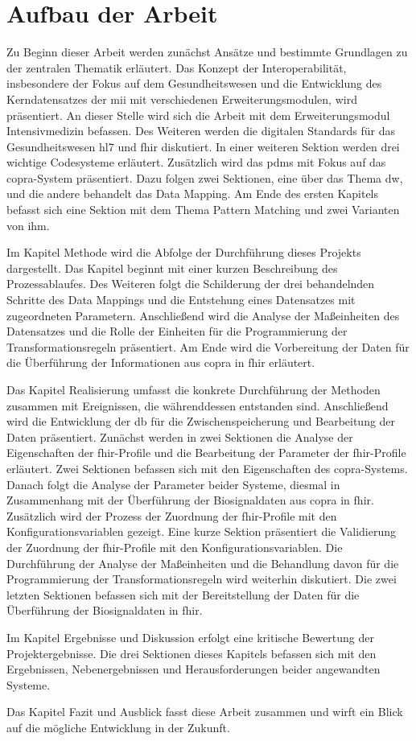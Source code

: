 \section{Aufbau der Arbeit} \label{sec:structure}

Zu Beginn dieser Arbeit werden zunächst Ansätze und bestimmte Grundlagen zu der zentralen Thematik erläutert. Das Konzept der Interoperabilität, insbesondere der Fokus auf dem Gesundheitswesen und die Entwicklung des Kerndatensatzes der \ac{mii} mit verschiedenen Erweiterungsmodulen, wird präsentiert. An dieser Stelle wird sich die Arbeit mit dem Erweiterungsmodul Intensivmedizin befassen. Des Weiteren werden die digitalen Standards für das Gesundheitswesen \ac{hl7} und \ac{fhir} diskutiert. In einer weiteren Sektion werden drei wichtige Codesysteme erläutert. Zusätzlich wird das \ac{pdms} mit Fokus auf das \ac{copra}-System präsentiert. Dazu folgen zwei Sektionen, eine über das Thema \ac{dw}, und die andere behandelt das Data Mapping. Am Ende des ersten Kapitels befasst sich eine Sektion mit dem Thema Pattern Matching und zwei Varianten von ihm.

Im Kapitel \glqq Methode\grqq{} wird die Abfolge der Durchführung dieses Projekts dargestellt. Das Kapitel beginnt mit einer kurzen Beschreibung des Prozessablaufes. Des Weiteren folgt die Schilderung der drei behandelnden Schritte des Data Mappings und die Entstehung eines Datensatzes mit zugeordneten Parametern. Anschließend wird die Analyse der Maßeinheiten des Datensatzes und die Rolle der Einheiten für die Programmierung der Transformationsregeln präsentiert. Am Ende wird die Vorbereitung der Daten für die Überführung der Informationen aus \ac{copra} in \ac{fhir} erläutert.

Das Kapitel \glqq Realisierung\grqq{} umfasst die konkrete Durchführung der Methoden zusammen mit Ereignissen, die währenddessen entstanden sind. Anschließend wird die Entwicklung der \ac{db} für die Zwischenspeicherung und Bearbeitung der Daten präsentiert. Zunächst werden in zwei Sektionen die Analyse der Eigenschaften der \ac{fhir}-Profile und die Bearbeitung der Parameter der \ac{fhir}-Profile erläutert. Zwei Sektionen befassen sich mit den Eigenschaften des \ac{copra}-Systems. Danach folgt die Analyse der Parameter beider Systeme, diesmal in Zusammenhang mit der Überführung der Biosignaldaten aus \ac{copra} in \ac{fhir}. Zusätzlich wird der Prozess der Zuordnung der \ac{fhir}-Profile mit den Konfigurationsvariablen gezeigt. Eine kurze Sektion präsentiert die Validierung der Zuordnung der \ac{fhir}-Profile mit den Konfigurationsvariablen. Die Durchführung der Analyse der Maßeinheiten und die Behandlung davon für die Programmierung der Transformationsregeln wird weiterhin diskutiert. Die zwei letzten Sektionen befassen sich mit der Bereitstellung der Daten für die Überführung der Biosignaldaten in \ac{fhir}.

Im Kapitel \glqq Ergebnisse und Diskussion\grqq{} erfolgt eine kritische Bewertung der Projektergebnisse. Die drei Sektionen dieses Kapitels befassen sich mit den Ergebnissen, Nebenergebnissen und Herausforderungen beider angewandten Systeme.

Das Kapitel \glqq Fazit und Ausblick\grqq{} fasst diese Arbeit zusammen und wirft ein Blick auf die mögliche Entwicklung in der Zukunft.